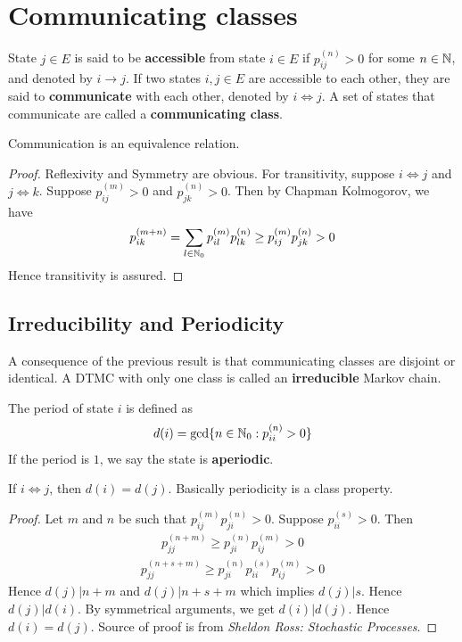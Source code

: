 \documentclass[a4paper,10pt,english]{article}
\begin{document}
\section{Communicating classes}
State $j \in E$ is said to be \textbf{accessible} from state $i \in E$ if $p_{ij}^{(n)} >0$ for some $n \in \mathbb{N}$, and denoted by $i \to j$. 
If two states $i,j \in E$ are accessible to each other, they are said to \textbf{communicate} with each other, denoted by $i \iff j$. 
A set of states that communicate are called a \textbf{communicating class}. 

\begin{prop}
Communication is an equivalence relation. 
\end{prop}
\begin{proof}
Reflexivity and Symmetry are obvious. For transitivity, suppose $i \iff j$ and $j \iff k$. Suppose $p_{ij}^{(m)} >0$ and $p_{jk}^{(n)} >0$. Then by Chapman Kolmogorov, we have
\begin{align*}p_{ik}^{(m+n)} = \sum_{l \in \mathbb{N}_0} p_{il}^{(m)}p_{lk}^{(n)} \geq p_{ij}^{(m)}p_{jk}^{(n)} >0  \end{align*}
Hence transitivity is assured.
\end{proof}

\subsection{Irreducibility and Periodicity}
A consequence of the previous result is that communicating classes are disjoint or identical. A DTMC with only one class is called an \textbf{irreducible} Markov chain.
\begin{defn}
The period of state $i$ is defined as
\begin{align*}d(i) = \gcd\{n \in \mathbb{N}_0 : p_{ii}^{(n)} > 0\}\end{align*}
If the period is $1$, we say the state is \textbf{aperiodic}.
\end{defn}

\begin{prop}
If $i \iff j$, then $d(i) = d(j)$. Basically periodicity is a class property.
\end{prop}
\begin{proof}
Let $m$ and $n$ be such that $p_{ij}^{(m)}p_{ji}^{(n)} > 0$. Suppose $p_{ii}^{(s)} > 0$. Then
\begin{align*} p_{jj}^{(n+m)} \geq p_{ji}^{(n)}p_{ij}^{(m)} > 0 \end{align*}
\begin{align*} p_{jj}^{(n+s+m)} \geq p_{ji}^{(n)}p_{ii}^{(s)}p_{ij}^{(m)} > 0 \end{align*}
Hence $d(j) | n+m$ and $d(j) | n+s+m$ which implies $d(j) | s$. Hence $d(j) | d(i)$. By symmetrical arguments, we get $d(i) | d(j)$. Hence $d(i) = d(j)$.
Source of proof is from \emph{Sheldon Ross: Stochastic Processes}.
\end{proof}
\end{document}
